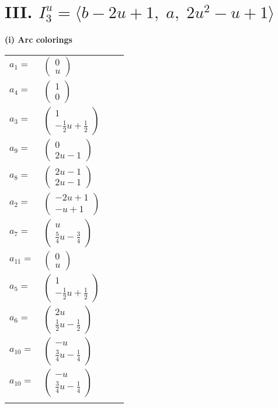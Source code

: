 \documentclass[1p]{elsarticle_modified}
\theoremstyle{definition}
\begin{document}
\centering \section*{III. $I^u_{3}= \langle b-2 u+1,\;a,\;2 u^2- u+1 \rangle$}
\flushleft \textbf{(i) Arc colorings}\\
\begin{tabular}{m{7pt} m{180pt} m{7pt} m{180pt} }
\flushright $a_{1}=$&$\begin{pmatrix}0\\u\end{pmatrix}$ \\
\flushright $a_{4}=$&$\begin{pmatrix}1\\0\end{pmatrix}$ \\
\flushright $a_{3}=$&$\begin{pmatrix}1\\-\frac{1}{2} u+\frac{1}{2}\end{pmatrix}$ \\
\flushright $a_{9}=$&$\begin{pmatrix}0\\2 u-1\end{pmatrix}$ \\
\flushright $a_{8}=$&$\begin{pmatrix}2 u-1\\2 u-1\end{pmatrix}$ \\
\flushright $a_{2}=$&$\begin{pmatrix}-2 u+1\\- u+1\end{pmatrix}$ \\
\flushright $a_{7}=$&$\begin{pmatrix}u\\\frac{5}{4} u-\frac{3}{4}\end{pmatrix}$ \\
\flushright $a_{11}=$&$\begin{pmatrix}0\\u\end{pmatrix}$ \\
\flushright $a_{5}=$&$\begin{pmatrix}1\\-\frac{1}{2} u+\frac{1}{2}\end{pmatrix}$ \\
\flushright $a_{6}=$&$\begin{pmatrix}2 u\\\frac{1}{2} u-\frac{1}{2}\end{pmatrix}$ \\
\flushright $a_{10}=$&$\begin{pmatrix}- u\\\frac{3}{4} u-\frac{1}{4}\end{pmatrix}$\\ \flushright $a_{10}=$&$\begin{pmatrix}- u\\\frac{3}{4} u-\frac{1}{4}\end{pmatrix}$\\&\end{tabular}
\end{document}
